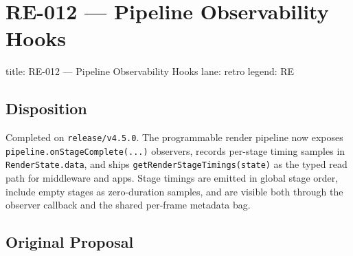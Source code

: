 \chapter{RE-012 --- Pipeline Observability Hooks}\label{record-398}

\smallskip

\begin{RecordMeta}
title: RE-012 — Pipeline Observability Hooks
lane: retro
legend: RE

\end{RecordMeta}

\section{Disposition}\label{record-398-disposition}

Completed on \texttt{r\allowbreak{}e\allowbreak{}l\allowbreak{}e\allowbreak{}a\allowbreak{}s\allowbreak{}e\allowbreak{}/\allowbreak{}v\allowbreak{}4\allowbreak{}.\allowbreak{}5\allowbreak{}.\allowbreak{}0}. The programmable render pipeline now exposes \texttt{p\allowbreak{}i\allowbreak{}p\allowbreak{}e\allowbreak{}l\allowbreak{}i\allowbreak{}n\allowbreak{}e\allowbreak{}.\allowbreak{}o\allowbreak{}n\allowbreak{}S\allowbreak{}t\allowbreak{}a\allowbreak{}g\allowbreak{}e\allowbreak{}C\allowbreak{}o\allowbreak{}m\allowbreak{}p\allowbreak{}l\allowbreak{}e\allowbreak{}t\allowbreak{}e\allowbreak{}(\allowbreak{}.\allowbreak{}.\allowbreak{}.\allowbreak{})} observers, records per-stage timing samples in \texttt{R\allowbreak{}e\allowbreak{}n\allowbreak{}d\allowbreak{}e\allowbreak{}r\allowbreak{}S\allowbreak{}t\allowbreak{}a\allowbreak{}t\allowbreak{}e\allowbreak{}.\allowbreak{}d\allowbreak{}a\allowbreak{}t\allowbreak{}a}, and ships \texttt{g\allowbreak{}e\allowbreak{}t\allowbreak{}R\allowbreak{}e\allowbreak{}n\allowbreak{}d\allowbreak{}e\allowbreak{}r\allowbreak{}S\allowbreak{}t\allowbreak{}a\allowbreak{}g\allowbreak{}e\allowbreak{}T\allowbreak{}i\allowbreak{}m\allowbreak{}i\allowbreak{}n\allowbreak{}g\allowbreak{}s\allowbreak{}(\allowbreak{}s\allowbreak{}t\allowbreak{}a\allowbreak{}t\allowbreak{}e\allowbreak{})} as the typed read path for middleware and apps. Stage timings are emitted in global stage order, include empty stages as zero-duration samples, and are visible both through the observer callback and the shared per-frame metadata bag.

\section{Original Proposal}\label{record-398-original-proposal}

